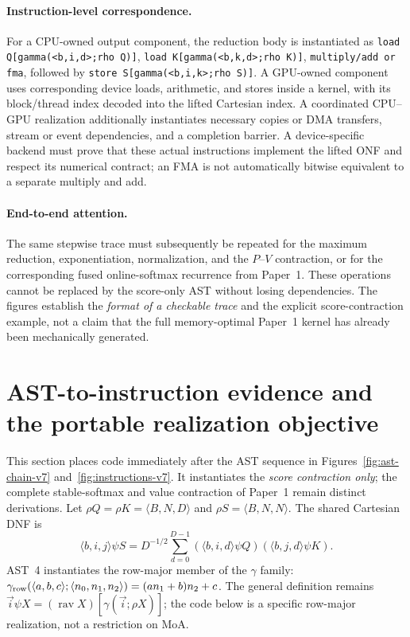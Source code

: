 \documentclass[11pt]{article}
\begin{document}
\paragraph{Instruction-level correspondence.}
For a CPU-owned output component, the reduction body is instantiated as \texttt{load Q[gamma(<b,i,d>;rho Q)]}, \texttt{load K[gamma(<b,k,d>;rho K)]}, \texttt{multiply/add or fma}, followed by \texttt{store S[gamma(<b,i,k>;rho S)]}. A GPU-owned component uses corresponding device loads, arithmetic, and stores inside a kernel, with its block/thread index decoded into the lifted Cartesian index. A coordinated CPU--GPU realization additionally instantiates necessary copies or DMA transfers, stream or event dependencies, and a completion barrier. A device-specific backend must prove that these actual instructions implement the lifted ONF and respect its numerical contract; an FMA is not automatically bitwise equivalent to a separate multiply and add.

\paragraph{End-to-end attention.}
The same stepwise trace must subsequently be repeated for the maximum reduction, exponentiation, normalization, and the $P$--$V$ contraction, or for the corresponding fused online-softmax recurrence from Paper~1. These operations cannot be replaced by the score-only AST without losing dependencies. The figures establish the \emph{format of a checkable trace} and the explicit score-contraction example, not a claim that the full memory-optimal Paper~1 kernel has already been mechanically generated.


\section{AST-to-instruction evidence and the portable realization objective}
\label{sec:code-traces}
This section places code immediately after the AST sequence in Figures~\ref{fig:ast-chain-v7} and~\ref{fig:instructions-v7}. It instantiates the \emph{score contraction only}; the complete stable-softmax and value contraction of Paper~1 remain distinct derivations. Let $\rho Q=\rho K=\langle B,N,D\rangle$ and $\rho S=\langle B,N,N\rangle$. The shared Cartesian DNF is
\begin{equation}
\langle b,i,j\rangle\psi S = D^{-1/2}\sum_{d=0}^{D-1}
(\langle b,i,d\rangle\psi Q)(\langle b,j,d\rangle\psi K).
\end{equation}
AST~4 instantiates the row-major member of the $\gamma$ family:
$\gamma_{\rm row}(\langle a,b,c\rangle;\langle n_0,n_1,n_2\rangle)=(a n_1+b)n_2+c$.
The general definition remains $\vec i\psi X=(\operatorname{rav}X)[\gamma(\vec i;\rho X)]$; the code below is a specific row-major realization, not a restriction on MoA.
\end{document}
